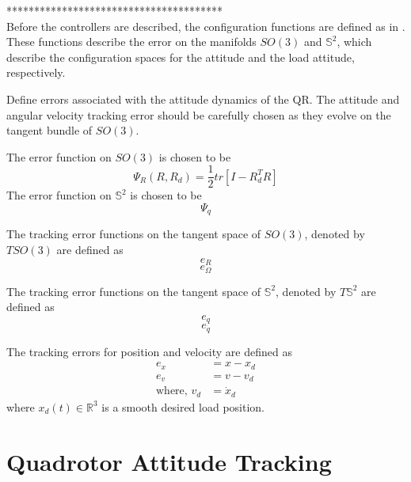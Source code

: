 ***************************************\\

Before the controllers are described, the configuration functions are defined as in \cite{Bullo2005}. These functions describe the error on the manifolds $ SO(3) $ and $ \mathbb{S}^2 $, which describe the configuration spaces for the  attitude and the load attitude, respectively.


Define errors associated with the attitude dynamics of the QR. The attitude and angular velocity tracking error should be carefully chosen as they evolve on the tangent bundle of  $ SO(3) $. \cite{Lee 2010c} 

The error function on $ SO(3) $ is chosen to be \cite{Lee2010}
\begin{equation}\label{eq:errorfunc}
\Psi_R(R,R_d)=\frac{1}{2}tr\left[I-R_d^TR\right]
\end{equation}
The error function on $ \mathbb{S}^2 $ is chosen to be 
\begin{equation}\label{key}
\Psi_q
\end{equation}


The tracking error functions on the tangent space of $ SO(3) $, denoted by $ TSO(3) $ are defined as
\begin{equation}\label{key}
e_R
\end{equation}
\begin{equation}\label{key}
e_\Omega 
\end{equation}

The tracking error functions on the tangent space of $ \mathbb{S}^2 $, denoted by $ T\mathbb{S}^2$ are defined as
\begin{equation}\label{key}
e_q
\end{equation}
\begin{equation}\label{key}
e_{\dot{q}} 
\end{equation}

The tracking errors for position and velocity are defined as
\begin{align}\label{key}
e_x&=x-x_d\\
e_v&=v-v_d\\
\text{where, }v_d&=\dot{x}_d
\end{align}
where $ x_d(t) \in \mathbb{R}^3$ is a smooth desired load position.

\section{Quadrotor Attitude Tracking}

